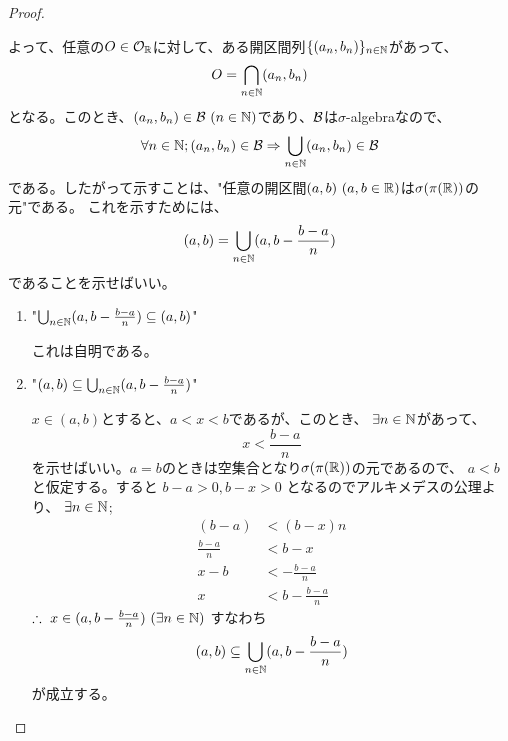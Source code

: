 \begin{proof}
\begin{enumerate}[font = \bfseries, label = step \arabic*.]
                    よって、任意の$O\in\mathcal{O}_{{\mathbb{R}}}$に対して、ある開区間列$\{(a_n, b_n)\}_{n\in{\mathbb{N}}}$があって、
                    \[
                        O = \bigcap_{n\in{\mathbb{N}}} (a_n, b_n)
                    \]
                    となる。このとき、$(a_n, b_n)\in\BB\ (n\in\NN)$であり、${\mathcal{B}}$は$\sigma$-algebraなので、
                    \[
                        \forall n \in {\mathbb{N}}; (a_n, b_n)\in{\mathcal{B}}\Rightarrow \bigcup_{n\in{\mathbb{N}}}(a_n, b_n)\in{\mathcal{B}}
                    \]
                    である。したがって示すことは、"任意の開区間$(a, b)\ (a, b\in {\mathbb{R}})$は$\sigma(\pi({\mathbb{R}}))$の元"である。
                    これを示すためには、
                    \[
                        (a, b) = \bigcup_{n\in{\mathbb{N}}}(a, b - \frac{b - a}{n})
                    \]
                    であることを示せばいい。
                    \begin{enumerate}
                        \item "$\bigcup_{n\in{\mathbb{N}}}(a, b - \frac{b - a}{n}) \subseteq (a, b)$"\par
                            これは自明である。
                        \item "$(a, b) \subseteq \bigcup_{n\in{\mathbb{N}}}(a, b - \frac{b - a}{n})$"\par
                            $x \in (a, b)$とすると、$a < x < b$であるが、このとき、
                            $\exists n\in {\mathbb{N}}$があって、
                            \[
                                x < \frac{b-a}{n}
                            \]
                            を示せばいい。$a = b$のときは空集合となり$\sigma(\pi({\mathbb{R}}))$の元であるので、
                            $a < b$と仮定する。すると
                            $b - a > 0, b - x > 0$
                            となるのでアルキメデスの公理より、
                            $\exists n \in {\mathbb{N}}$;
                            \begin{align*}
                                (b-a) &< (b-x)n \\
                                \frac{b-a}{n} &< b-x \\
                                x - b &< -\frac{b-a}{n} \\
                                x &< b - \frac{b-a}{n}
                            \end{align*}
                            $\therefore\ x\in (a, b - \frac{b-a}{n})\ (\exists n\in {\mathbb{N}})$
                            すなわち
                            \[
                                (a, b) \subseteq \bigcup_{n\in{\mathbb{N}}}(a, b - \frac{b - a}{n})
                            \]
                            が成立する。
                    \end{enumerate}
            \end{enumerate}
        \end{proof}
    